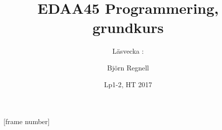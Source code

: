 [frame number]
\title[Föreläsningsanteckningar EDAA45, 2016]{EDAA45 Programmering, grundkurs}
\subtitle{Läsvecka \vecka: \veckotema}
\author{Björn Regnell}
\date{Lp1-2, HT 2017}
